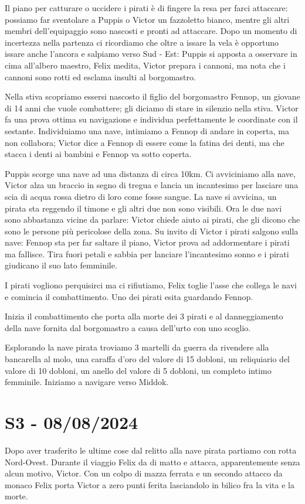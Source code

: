 \documentclass[letterpaper,twocolumn,openany, nodeprecatedcode, nomultitoc]{dndbook}
\begin{document}
Il piano per catturare o uccidere i pirati è di fingere la resa per farci attaccare: possiamo far sventolare a Puppis o Victor un fazzoletto bianco, mentre gli altri membri dell'equipaggio sono nascosti e pronti ad attaccare. Dopo un momento di incertezza nella partenza ci ricordiamo che oltre a issare la vela è opportuno issare anche l'ancora e salpiamo verso Sud - Est: Puppis si apposta a osservare in cima all'albero maestro, Felix medita, Victor prepara i cannoni, ma nota che i cannoni sono rotti ed esclama insulti al borgomastro.

Nella stiva scopriamo essersi nascosto il figlio del borgomastro Fennop, un giovane di 14 anni che vuole combattere; gli diciamo di stare in silenzio nella stiva. Victor fa una prova ottima su navigazione e individua perfettamente le coordinate con il sestante. Individuiamo una nave, intimiamo a Fennop di andare in coperta, ma non collabora; Victor dice a Fennop di essere come la fatina dei denti, ma che stacca i denti ai bambini e Fennop va sotto coperta.

Puppis scorge una nave ad una distanza di circa 10km. Ci avviciniamo alla nave, Victor alza un braccio in segno di tregua e lancia un incantesimo per lasciare una scia di acqua rossa dietro di loro come fosse sangue. La nave si avvicina, un pirata sta reggendo il timone e gli altri due non sono visibili. Ora le due navi sono abbastanza vicine da parlare: Victor chiede aiuto ai pirati, che gli dicono che sono le persone più pericolose della zona. Su invito di Victor i pirati salgono sulla nave: Fennop sta per far saltare il piano, Victor prova ad addormentare i pirati ma fallisce. Tira fuori petali e sabbia per lanciare l'incantesimo sonno e i pirati giudicano il suo lato femminile.

I pirati vogliono perquisirci ma ci rifiutiamo, Felix toglie l'asse che collega le navi e comincia il combattimento.
Uno dei pirati esita guardando Fennop.

Inizia il combattimento che porta alla morte dei 3 pirati e al danneggiamento della nave fornita dal borgomastro a causa dell'urto con uno scoglio.

Esplorando la nave pirata troviamo 3 martelli da guerra da rivendere alla bancarella al molo, una caraffa d'oro del valore di 15 dobloni,  un reliquiario del valore di 10 dobloni, un anello del valore di 5 dobloni, un completo intimo femminile. Iniziamo a navigare verso Middok.

\section{S3 - 08/08/2024}
Dopo aver trasferito le ultime cose dal relitto alla nave pirata partiamo con rotta Nord-Ovest. Durante il viaggio Felix da di matto e attacca, apparentemente senza alcun motivo, Victor. Con un colpo di mazza ferrata e un secondo attacco da monaco Felix porta Victor a zero punti ferita lasciandolo in bilico fra la vita e la morte.
\end{document}
